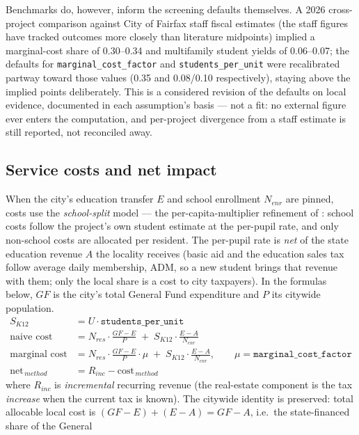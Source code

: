 \documentclass[11pt]{article}
\newcommand{\assum}[1]{\texttt{#1}}
\begin{document}
Benchmarks do, however, inform the screening defaults themselves. A 2026
cross-project comparison against City of Fairfax staff fiscal estimates
(the staff figures have tracked outcomes more closely than literature
midpoints) implied a marginal-cost share of 0.30--0.34 and multifamily
student yields of 0.06--0.07; the defaults for
\assum{marginal\_cost\_factor} and \assum{students\_per\_unit} were
recalibrated partway toward those values (0.35 and 0.08/0.10 respectively),
staying above the implied points deliberately. This is a considered revision
of the defaults on local evidence, documented in each assumption's basis ---
not a fit: no external figure ever enters the computation, and per-project
divergence from a staff estimate is still reported, not reconciled away.

\subsection{Service costs and net impact}
When the city's education transfer $E$ and school enrollment $N_{enr}$ are
pinned, costs use the \emph{school-split} model --- the per-capita-multiplier
refinement of \cite{burchell1978}: school costs follow the project's own
student estimate at the per-pupil rate, and only non-school costs are
allocated per resident. The per-pupil rate is \emph{net} of the state
education revenue $A$ the locality receives (basic aid and the education
sales tax follow average daily membership, ADM, so a new student brings that
revenue with them; only the local share is a cost to city taxpayers). In the
formulas below, $GF$ is the city's total General Fund expenditure and $P$
its citywide population.
\begin{align}
S_{K12} &= U \cdot \assum{students\_per\_unit} \\
\text{naive cost} &= N_{res} \cdot \frac{GF - E}{P}
                     \;+\; S_{K12} \cdot \frac{E - A}{N_{enr}} \\
\text{marginal cost} &= N_{res} \cdot \frac{GF - E}{P} \cdot \mu
                     \;+\; S_{K12} \cdot \frac{E - A}{N_{enr}}, \qquad
\mu = \assum{marginal\_cost\_factor} \\
\text{net}_{\,method} &= R_{inc} - \text{cost}_{\,method}
\end{align}
where $R_{inc}$ is \emph{incremental} recurring revenue (the real-estate
component is the tax \emph{increase} when the current tax is known).
The citywide identity is preserved: total allocable local cost is
$(GF - E) + (E - A) = GF - A$, i.e.\ the state-financed share of the General
\end{document}
